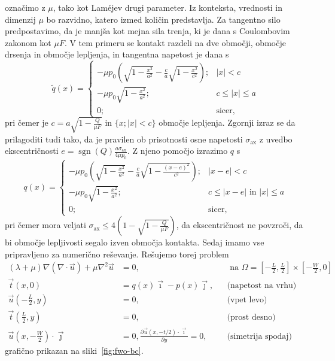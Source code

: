 \documentclass[12pt,a4paper,twoside]{article}
\theoremstyle{definition} %
\theoremstyle{plain} %
\numberwithin{equation}{section}
\newcommand{\dpar}[2]{\ensuremath{\frac{\partial #1}{\partial #2}}}
\newcommand{\vt}{\vec{t}}
\newcommand{\vu}{\vec{u}}
\newcommand{\vi}{\vec{\imath}}
\newcommand{\vj}{\vec{\jmath}}
\newcommand{\sax}{\ensuremath{\sigma_{\text{ax}}}}
\DeclareMathOperator{\sgn}{sgn}
\begin{document}
označimo z $\mu$, tako kot Lam\'ejev drugi parameter. Iz konteksta, vrednosti in dimenzij $\mu$ bo
razvidno, katero izmed količin predstavlja. Za tangentno silo predpostavimo, da je manjša kot mejna
sila trenja, ki je dana s Coulombovim zakonom kot $\mu F$. V tem primeru se kontakt razdeli na dve
območji, območje drsenja in območje lepljenja, in tangentna napetost je dana s
\begin{equation}
  \tilde q(x) = \begin{cases}
      -\mu p_0 \left(\sqrt{1 - \frac{x^2}{a^2}} - \frac{c}{a}\sqrt{1 - \frac{x^2}{c^2}}\right);& |x|
      < c \\
      -\mu p_0 \sqrt{1 - \frac{x^2}{a^2}}; & c \leq |x| \leq a \\
      0; & \text{sicer,}
    \end{cases}
\end{equation}
pri čemer je $c = a\sqrt{1 - \frac{Q}{\mu F}}$ in $\{x; |x| < c\}$ območje lepljenja.
Zgornji izraz se da prilagoditi tudi tako, da je pravilen ob prisotnosti osne napetosti
$\sax$ z uvedbo ekscentričnosti $e = \sgn(Q)\frac{a \sax}{4 \mu p_0}$.
Z njeno pomočjo izrazimo $q$ s
\begin{equation}
q(x) = \begin{cases}
-\mu p_0 \left(\sqrt{1 - \frac{x^2}{a^2}} - \frac{c}{a}\sqrt{1 - \frac{(x-e)^2}{c^2}}\right); &
|x-e| < c \\
-\mu p_0 \sqrt{1 - \frac{x^2}{a^2}}; & c \leq | x - e | \text{ in } |x| \leq a \\
0; & \text{sicer,}
\end{cases}
\end{equation}
pri čemer mora veljati $\sax \leq 4\left( 1 - \sqrt{1-\frac{Q}{\mu F}} \right)$, da ekscentričnost
ne povzroči, da bi območje lepljivosti segalo izven območja kontakta. Sedaj imamo vse pripravljeno
za numerično reševanje. Rešujemo torej problem
\begin{align}
  (\lambda + \mu) \nabla(\nabla\cdot \vu) + \mu \nabla^2 \vu &= 0, && \text{ na } \Omega =
  [-\frac{L}{2}, \frac{L}{2}]\times[-\frac{W}{2}, 0] \nonumber  \\
  \vt(x, 0) &= q(x)\vi - p(x)\vj, && \text{(napetost na vrhu)} \nonumber \\
    \vu(-\frac{L}{2}, y) &= 0,  && \text{(vpet levo)} \label{eq:fwo-problem}\\
    \vt(\frac{L}{2}, y) &= 0, \nonumber  && \text{(prost desno)}\\
    \vu(x, -\frac{W}{2})\cdot \vj &= 0, \dpar{\vu(x, -t/2)\cdot \vi}{y} = 0, \nonumber  && \text{(simetrija
    spodaj)}
\end{align}
grafično prikazan na sliki~\ref{fig:fwo-bc}.
\end{document}
